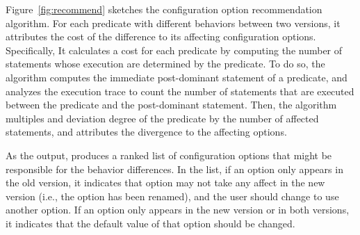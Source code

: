 Figure~\ref{fig:recommend} sketches the configuration option
recommendation algorithm.
For each predicate with different behaviors between two
versions, it attributes the cost of the difference 
to its affecting configuration options. Specifically,
It calculates a cost for each predicate by computing
the number of statements whose execution are determined
by the predicate. To do so, the algorithm computes the
immediate post-dominant statement of a predicate, and analyzes
the execution trace to count the number of statements that
are executed between the predicate and the post-dominant
statement. Then, the algorithm multiples and deviation
degree of the predicate by the number of affected statements,
and attributes the divergence to the affecting options.

As the output, \ourtool produces a ranked list of
configuration options that might be responsible for the
behavior differences. In the list, if an option only appears
in the old version, it indicates that option may not
take any affect in the new version (i.e., the option has
been renamed), and the user should change to use another option.
If an option only appears in the new version or in both
versions, it indicates that
the default value of that option should be changed.









